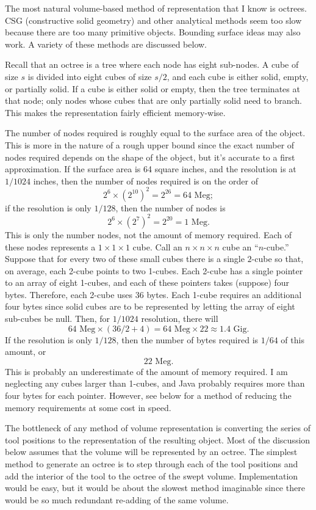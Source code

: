 \documentclass[titlepage,oneside,10pt]{article}
\begin{document}
The most natural volume-based method of representation that I know is
octrees. CSG (constructive solid geometry) and other analytical
methods seem too slow because there are too many primitive
objects. Bounding surface ideas may also work. A variety of these
methods are discussed below. 

Recall that an octree is a tree where each node has eight
sub-nodes. A cube of size $s$ is divided into eight cubes of size
$s/2$, and each cube is either solid, empty, or partially solid. If a
cube is either solid or empty, then the tree terminates at that node;
only nodes whose cubes that are only partially solid need to
branch. This makes the representation fairly efficient
memory-wise. 

The number of nodes required is roughly equal to the surface area of
the object. This is more in the nature of a rough upper bound since
the exact number of nodes required depends on the shape of the object,
but it's accurate to a first approximation. If the surface area is 64
square inches, and the resolution is at $1/1024$ inches, then the
number of nodes required is on the order of
$$2^6\times (2^{10})^2 = 2^{26} = 64\mbox{ Meg};$$
if the resolution is only $1/128$, then the number of nodes is
$$2^6\times (2^7)^2 = 2^{20} = 1\mbox{ Meg}.$$
This is only the number nodes, not the amount of memory required. Each
of these nodes represents a $1\times1\times1$ cube. Call an $n\times
n\times n$ cube an ``$n$-cube.'' Suppose that for
every two of these small cubes there is a single $2$-cube so that, on
average, each 2-cube points to two 1-cubes. Each 2-cube has a single
pointer to an array of eight 1-cubes, and each of these pointers takes
(suppose) four bytes. Therefore, each 2-cube uses 36 bytes. Each
1-cube requires an additional four bytes 
since solid cubes are to be represented by letting the array of eight
sub-cubes be null. Then, for $1/1024$ resolution, there will 
$$64\mbox{ Meg}\times (36/2 + 4) = 64\mbox{ Meg}\times 22\approx
1.4\mbox{ Gig}.$$
If the resolution is only $1/128$, then the number of bytes required
is $1/64$ of this amount, or
$$22\mbox{ Meg}.$$
This is probably an underestimate of the amount of memory required. I
am neglecting any cubes larger than 1-cubes, and Java probably
requires more than four bytes for each pointer. However, see below for
a method of reducing the memory requirements at some cost in
speed.

The bottleneck of any method of volume representation is converting
the series of tool positions to the representation
of the resulting object. Most of the discussion below assumes that the
volume will be represented by an octree. The simplest method to
generate an octree is to step through each
of the tool positions and add the interior of the tool to the octree
of the swept volume. Implementation would be easy, but it would be
about the slowest method imaginable since there would be so much
redundant re-adding of the same volume.
\end{document}
